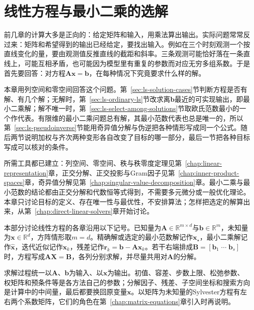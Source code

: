 
\chapter{线性方程与最小二乘的选解}
\label{sec:ls-solution-selection}
\label{chap:linear-solution-selection}
\label{chap:linear-equations-and-optimization}
\label{sec:linear-algebra-reachability-solvability}

前几章的计算大多是正向的：给定矩阵和输入，用乘法算出输出。实际问题常常反过来：矩阵和希望得到的输出已经给定，要找出输入。例如在三个时刻观测一个按直线变化的量，要由观测值反推直线的截距和斜率。三条观测可能恰好落在一条直线上，可能互相矛盾，也可能因为模型里有重复的参数而对应无穷多组系数。于是首先要回答：对方程$\bm A\bm x=\bm b$，在每种情况下究竟要求什么样的解。

本章用列空间和零空间回答这个问题。第~\ref{sec:ls-solution-cases}节判断方程是否有解、有几个解；无解时，第~\ref{sec:ls-ordinary-ls}节改求离$\bm b$最近的可实现输出，即最小二乘解；解不唯一时，第~\ref{sec:ls-select-among-solutions}节取欧氏范数最小的一个作代表。有限维的最小二乘问题总有解，其最小范数代表也总是唯一的，所以第~\ref{sec:ls-pseudoinverse}节能用奇异值分解与伪逆把各种情形写成同一个公式。随后两节说明加权与齐次两种变形各自改变了目标的哪一部分，最后一节把各种目标写成可以核对的条件。

所需工具都已建立：列空间、零空间、秩与秩零度定理见第~\ref{chap:linear-representation}章，正交分解、正交投影与Gram因子见第~\ref{chap:inner-product-spaces}章，奇异值分解见第~\ref{chap:singular-value-decomposition}章。最小二乘与最小范数的结论都由正交分解和代数恒等式得到，不需要多元微分或一般优化理论。本章只讨论目标的定义、存在唯一性与最优性，不安排算法；怎样把选定的解算出来，从第~\ref{chap:direct-linear-solvers}章开始讨论。

本部分讨论线性方程的各章沿用以下记号。已知量为$\bm A\in\mathbb R^{m\times d}$与$\bm b\in\mathbb R^m$，未知量为$\bm x\in\mathbb R^d$，方阵情形取$m=d$。精确解或选定的最小范数解记作$\bm x_\star$，最小二乘解记作$\hat{\bm x}$，迭代近似记作$\bm x_k$，残差记作$\bm r_k=\bm b-\bm A\bm x_k$。若干右端排成$\bm B=[\bm b_1\;\cdots\;\bm b_s]$时，方程写成$\bm A\bm X=\bm B$，各列分别求解，并尽量共用对$\bm A$的分解。

求解过程统一以$\bm A$、$\bm b$为输入、以$\bm x$为输出。初值、容差、步数上限、松弛参数、权矩阵和预条件等是各方法自己的参数；分解因子、残差、子空间坐标和搜索方向是计算中的中间量，最后都要换回原变量$\bm x$。以矩阵为未知量的Sylvester方程有左右两个系数矩阵，它们的角色在第~\ref{chap:matrix-equations}章引入时再说明。

